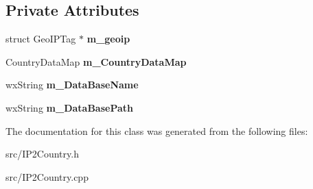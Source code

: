 \subsection*{Private Attributes}
\begin{DoxyCompactItemize}
\item 
struct GeoIPTag $\ast$ {\bfseries m\_\-geoip}\label{classCIP2Country_a228e66a7f668fea3f8f838a72bf7cb8b}

\item 
CountryDataMap {\bfseries m\_\-CountryDataMap}\label{classCIP2Country_a47fb95d759354b8083d9987bdd6932fe}

\item 
wxString {\bfseries m\_\-DataBaseName}\label{classCIP2Country_a1e867dc44795a150c09bc7e81015857d}

\item 
wxString {\bfseries m\_\-DataBasePath}\label{classCIP2Country_a5725f08baa2959ec58de961dcc124ee1}

\end{DoxyCompactItemize}


The documentation for this class was generated from the following files:\begin{DoxyCompactItemize}
\item 
src/IP2Country.h\item 
src/IP2Country.cpp\end{DoxyCompactItemize}
